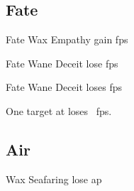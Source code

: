 \begin{multicols}{2}

\subsection{Fate}

  {Fate}%
  {Wax}%
  {\duplicated}%
  {Empathy}%
  {gain  \glspl{fp}}%

  {Fate}%
  {Wane}%
  {\duplicated}%
  {Deceit}%
  {lose  \glspl{fp}}%

  {Fate}%
  {Wane}%
  {\distant}%
  {Deceit}%
  {loses  \glspl{fp}}%

One target at \spellRange{} loses ~\glspl{fp}.

\subsection{Air}

  {\mAir}%
  {Wax}%
  {\duplicated}%
  {Seafaring}%
  {lose  \gls{ap}}%

\end{multicols}
